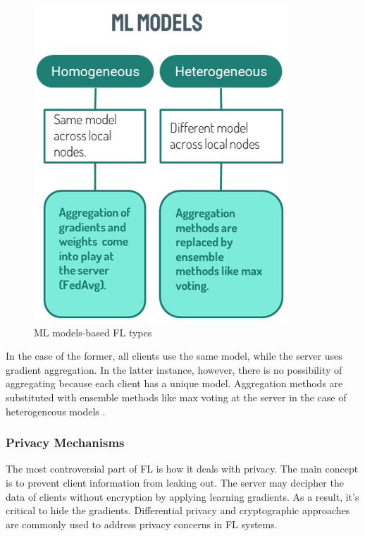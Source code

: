 \begin{figure}[H]
\centering
\includegraphics[scale=0.5]{img/fl_mlmodels.png}
\caption{ML models-based FL types}
\label{fig:fl_mlmodels}
\end{figure}

In the case of the former, all clients use the same model, while the server uses gradient aggregation. In the latter instance, however, there is no possibility of aggregating because each client has a unique model. Aggregation methods are substituted with ensemble methods like max voting at the server in the case of heterogeneous models \cite{fl26_types}.

\subsubsection{Privacy Mechanisms}

The most controversial part of FL is how it deals with privacy. The main concept is to prevent client information from leaking out. The server may decipher the data of clients without encryption by applying learning gradients. As a result, it's critical to hide the gradients. Differential privacy and cryptographic approaches are commonly used to address privacy concerns in FL systems.

